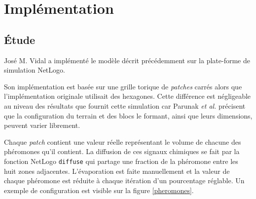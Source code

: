 \documentclass[12pt]{article}
\begin{document}
\section{Implémentation}

\subsection{\'Etude}

José M. Vidal a implémenté le modèle décrit précédemment sur la
plate-forme de simulation NetLogo.

Son implémentation est basée sur une grille torique de
\textit{patches} carrés alors que l'implémentation originale utilisait
des hexagones. Cette différence est négligeable au niveau des
résultats que fournit cette simulation car Parunak \textit{et al.}
précisent que la configuration du terrain et des blocs le formant,
ainsi que leurs dimensions, peuvent varier librement.

Chaque \textit{patch} contient une valeur réelle représentant le
volume de chacune des phéromones qu'il contient. La diffusion de ces
signaux chimiques se fait par la fonction NetLogo \texttt{diffuse} qui
partage une fraction de la phéromone entre les huit zones
adjacentes. L'évaporation est faite manuellement et la valeur de
chaque phéromone est réduite à chaque itération d'un pourcentage
réglable. Un exemple de configuration est visible sur la figure
\ref{pheromones}.
\end{document}
